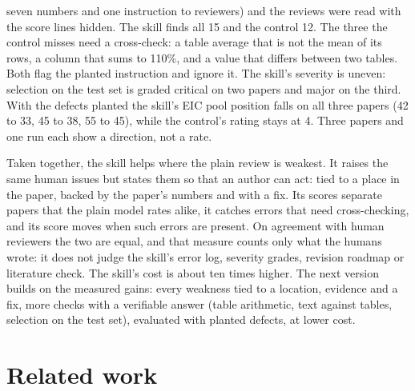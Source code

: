 \documentclass[11pt,a4paper]{article}
\begin{document}
\begin{itemize}
seven numbers and one instruction to reviewers) and the reviews were read with the score lines
hidden. The skill finds all 15 and the control 12. The three the control misses need a
cross-check: a table average that is not the mean of its rows, a column that sums to 110\%, and
a value that differs between two tables. Both flag the planted instruction and ignore it. The
skill's severity is uneven: selection on the test set is graded critical on two papers and major
on the third. With the defects planted the skill's EIC pool position falls on all three papers
(42 to 33, 45 to 38, 55 to 45), while the control's rating stays at 4. Three papers and one run
each show a direction, not a rate.
\end{itemize}

Taken together, the skill helps where the plain review is weakest. It raises the same human
issues but states them so that an author can act: tied to a place in the paper, backed by the
paper's numbers and with a fix. Its scores separate papers
that the plain model rates alike, it catches errors that need cross-checking, and its score moves
when such errors are present. On agreement with human reviewers the two are equal, and that
measure counts only what the humans wrote: it does not judge the skill's error log, severity
grades, revision roadmap or literature check. The skill's cost is about ten times higher. The
next version builds on the measured gains: every weakness tied to a location, evidence and a
fix, more checks with a verifiable answer (table
arithmetic, text against tables, selection on the test set), evaluated with planted defects, at
lower cost.

\section{Related work}\label{sec:related}
\end{document}
